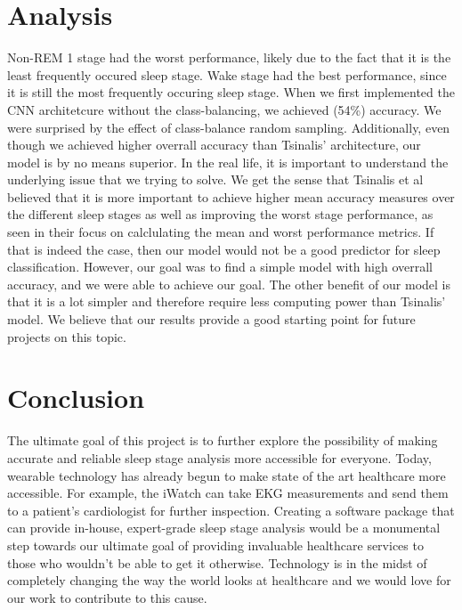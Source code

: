 \documentclass{amia}
\begin{document}
\section*{Analysis}

Non-REM 1 stage had the worst performance, likely due to the fact that it is the least frequently occured sleep stage. Wake stage had the best performance, since it is still the most frequently occuring sleep stage. When we first implemented the CNN architetcure without the class-balancing, we achieved (54\%) accuracy. We were surprised by the effect of class-balance random sampling. Additionally, even though we achieved higher overrall accuracy than Tsinalis' architecture, our model is by no means superior. In the real life, it is important to understand the underlying issue that we trying to solve. We get the sense that Tsinalis et al believed that it is more important to achieve higher mean accuracy measures over the different sleep stages as well as improving the worst stage performance, as seen in their focus on calclulating the mean and worst performance metrics. If that is indeed the case, then our model would not be a good predictor for sleep classification. However, our goal was to find a simple model with high overrall accuracy, and we were able to achieve our goal. The other benefit of our model is that it is a lot simpler and therefore require less computing power than Tsinalis' model. We believe that our results provide a good starting point for future projects on this topic.

\section*{Conclusion}
The ultimate goal of this project is to further explore the possibility of making accurate and reliable sleep stage analysis more accessible for everyone. Today, wearable technology has already begun to make state of the art healthcare more accessible. For example, the iWatch can take EKG measurements and send them to a patient's cardiologist for further inspection. Creating a software package that can provide in-house, expert-grade sleep stage analysis would be a monumental step towards our ultimate goal of providing invaluable healthcare services to those who wouldn't be able to get it otherwise. Technology is in the midst of completely changing the way the world looks at healthcare and we would love for our work to contribute to this cause. 

\newpage
\end{document}
